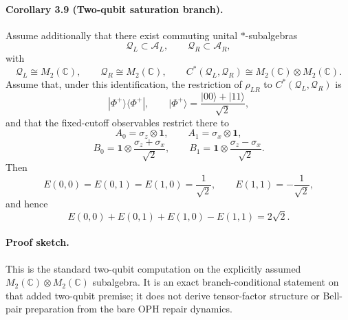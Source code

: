 \paragraph{\textbf{Corollary 3.9 (Two-qubit saturation branch).}}
Assume additionally that there exist commuting unital \(*\)-subalgebras
\[
\mathcal Q_L\subset \mathcal A_L,
\qquad
\mathcal Q_R\subset \mathcal A_R,
\]
with
\[
\mathcal Q_L\cong M_2(\mathbb C),
\qquad
\mathcal Q_R\cong M_2(\mathbb C),
\qquad
C^*(\mathcal Q_L,\mathcal Q_R)\cong M_2(\mathbb C)\otimes M_2(\mathbb C).
\]
Assume that, under this identification, the restriction of \(\rho_{LR}\) to
\(C^*(\mathcal Q_L,\mathcal Q_R)\) is
\[
|\Phi^+\rangle\!\langle\Phi^+|,
\qquad
|\Phi^+\rangle=\frac{|00\rangle+|11\rangle}{\sqrt2},
\]
and that the fixed-cutoff observables restrict there to
\[
A_0=\sigma_z\otimes \mathbf 1,
\qquad
A_1=\sigma_x\otimes \mathbf 1,
\]
\[
B_0=\mathbf 1\otimes \frac{\sigma_z+\sigma_x}{\sqrt2},
\qquad
B_1=\mathbf 1\otimes \frac{\sigma_z-\sigma_x}{\sqrt2}.
\]
Then
\[
E(0,0)=E(0,1)=E(1,0)=\frac{1}{\sqrt2},
\qquad
E(1,1)=-\frac{1}{\sqrt2},
\]
and hence
\[
E(0,0)+E(0,1)+E(1,0)-E(1,1)=2\sqrt2.
\]

\paragraph{\textbf{Proof sketch.}}
This is the standard two-qubit computation on the explicitly assumed
\(M_2(\mathbb C)\otimes M_2(\mathbb C)\) subalgebra. It is an exact branch-conditional statement
on that added two-qubit premise; it does not derive tensor-factor structure or Bell-pair
preparation from the bare OPH repair dynamics.
